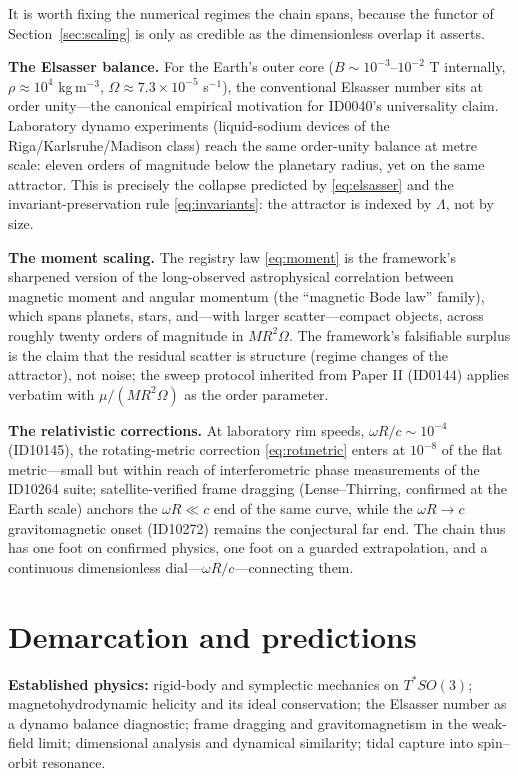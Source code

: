 \documentclass[11pt]{article}
\theoremstyle{remark}
\begin{document}
It is worth fixing the numerical regimes the chain spans, because the functor of Section~\ref{sec:scaling} is only as credible as the dimensionless overlap it asserts.

\textbf{The Elsasser balance.} For the Earth's outer core ($B \sim 10^{-3}$--$10^{-2}$ T internally, $\rho \approx 10^4$ kg\,m$^{-3}$, $\Omega \approx 7.3 \times 10^{-5}$ s$^{-1}$), the conventional Elsasser number sits at order unity---the canonical empirical motivation for ID0040's universality claim. Laboratory dynamo experiments (liquid-sodium devices of the Riga/Karlsruhe/Madison class) reach the same order-unity balance at metre scale: eleven orders of magnitude below the planetary radius, yet on the same attractor. This is precisely the collapse predicted by \eqref{eq:elsasser} and the invariant-preservation rule \eqref{eq:invariants}: the attractor is indexed by $\Lambda$, not by size.

\textbf{The moment scaling.} The registry law \eqref{eq:moment} is the framework's sharpened version of the long-observed astrophysical correlation between magnetic moment and angular momentum (the ``magnetic Bode law'' family), which spans planets, stars, and---with larger scatter---compact objects, across roughly twenty orders of magnitude in $MR^2\Omega$. The framework's falsifiable surplus is the claim that the residual scatter is structure (regime changes of the attractor), not noise; the sweep protocol inherited from Paper II (ID0144) applies verbatim with $\mu/(MR^2\Omega)$ as the order parameter.

\textbf{The relativistic corrections.} At laboratory rim speeds, $\omega R / c \sim 10^{-4}$ (ID10145), the rotating-metric correction \eqref{eq:rotmetric} enters at $10^{-8}$ of the flat metric---small but within reach of interferometric phase measurements of the ID10264 suite; satellite-verified frame dragging (Lense--Thirring, confirmed at the Earth scale) anchors the $\omega R \ll c$ end of the same curve, while the $\omega R \to c$ gravitomagnetic onset (ID10272) remains the conjectural far end. The chain thus has one foot on confirmed physics, one foot on a guarded extrapolation, and a continuous dimensionless dial---$\omega R/c$---connecting them.

\section{Demarcation and predictions}
\label{sec:demarcation}

\textbf{Established physics:} rigid-body and symplectic mechanics on $T^* SO(3)$; magnetohydrodynamic helicity and its ideal conservation; the Elsasser number as a dynamo balance diagnostic; frame dragging and gravitomagnetism in the weak-field limit; dimensional analysis and dynamical similarity; tidal capture into spin--orbit resonance.
\end{document}
